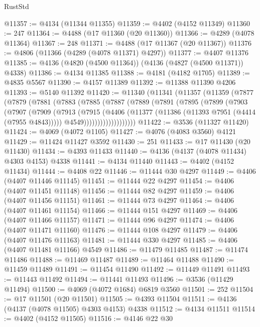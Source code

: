 \begin{lexlean}{RustStd}
\begin{coremodule}
@11357 := @4134 (@11344 @11355)
@11359 := @4402 (@4152 @11349)
@11360 := 247
@11364 := @4488 (@17 @11360 (@20 @11360))
@11366 := @4289 (@4078 @11364)
@11367 := 248
@11371 := @4488 (@17 @11367 (@20 @11367))
@11376 := @4806 (@11366 (@4289 (@4078 @11371) @4297))
@11377 := @4407 @11376
@11385 := @4136 (@4820 (@4500 @11364)) (@4136 (@4827 (@4500 @11371)) @4338)
@11386 := @4134 @11385
@11388 := @4181 (@4182 @1705)
@11389 := @4835 @5567
@11390 := @4157 @11389
@11392 := @11388 @11390 @4206
@11393 := @5140 @11392
@11420 := @11340
    (@11341
      (@11357
        (@11359
          (@7877
            (@7879
              (@7881
                (@7883
                  (@7885
                    (@7887
                      (@7889
                        (@7891
                          (@7895
                            (@7899
                              (@7903
                                (@7907
                                  (@7909
                                    (@7913
                                      (@7915
                                        (@4406
                                          (@11377 (@11386 (@11393 @7951 (@4414 (@7955 @4843)))))
                                          @4549)))))))))))))))))))
@11422 := @3536 (@11327 @11420)
@11424 := @4069 (@4072 @1105)
@11427 := @4076 (@4083 @3560) @4121
@11429 := @11424 @11427 @3592
@11430 := 251
@11433 := @17 @11430 (@20 @11430)
@11434 := @4393 @11433
@11440 := @4136 (@4137 (@4078 @11434) @4303 @4153) @4338
@11441 := @4134 @11440
@11443 := @4402 (@4152 @11434)
@11444 := @4408 @22
@11446 := @11444 @30 @4297
@11449 := @4406 (@4407 @11446 @11145)
@11451 := @11444 @22 @4297
@11454 := @4406 (@4407 @11451 @11148)
@11456 := @11444 @82 @4297
@11459 := @4406 (@4407 @11456 @11151)
@11461 := @11444 @73 @4297
@11464 := @4406 (@4407 @11461 @11154)
@11466 := @11444 @151 @4297
@11469 := @4406 (@4407 @11466 @11157)
@11471 := @11444 @96 @4297
@11474 := @4406 (@4407 @11471 @11160)
@11476 := @11444 @108 @4297
@11479 := @4406 (@4407 @11476 @11163)
@11481 := @11444 @330 @4297
@11485 := @4406 (@4407 @11481 @11166) @4549
@11486 := @11479 @11485
@11487 := @11474 @11486
@11488 := @11469 @11487
@11489 := @11464 @11488
@11490 := @11459 @11489
@11491 := @11454 @11490
@11492 := @11449 @11491
@11493 := @11443 @11492
@11494 := @11441 @11493
@11496 := @3536 (@11429 @11494)
@11500 := @4069 (@4072 @1684) @6819 @3560
@11501 := 252
@11504 := @17 @11501 (@20 @11501)
@11505 := @4393 @11504
@11511 := @4136 (@4137 (@4078 @11505) @4303 @4153) @4338
@11512 := @4134 @11511
@11514 := @4402 (@4152 @11505)
@11516 := @4146 @22 @30

\end{coremodule}
\end{lexlean}

